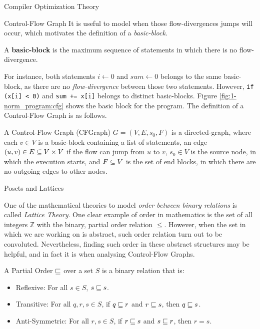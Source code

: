 \begin{section}{Compiler Optimization Theory}
\begin{subsection}{Control-Flow Graph}
It is useful to model when those flow-divergences jumps will occur, which
motivates the definition of a \textit{basic-block}.

\begin{definition}
A \textbf{basic-block} is the maximum sequence of statements in which there is
no flow-divergence.
\end{definition}

For instance, both statements $i \leftarrow 0$ and $\textit{sum} \leftarrow 0$ belongs
to the same basic-block, as there are no \textit{flow-divergence} between
those two statements. However, \texttt{if (x[i] < 0)} and \texttt{sum += x[i]}
belongs to distinct basic-blocks. Figure \ref{fig:1-norm_program:cfg} shows
the basic block for the program. The definition of a Control-Flow Graph is
as follows.

\begin{definition}
	A Control-Flow Graph (CFGraph) $G = (V, E, s_0, F)$ is a directed-graph,
	where each $v \in V$ is a basic-block containing a list of statements,
	an edge $(u, v) \in E \subseteq V \times V$ if the flow can jump from
	$u$ to $v$, $s_0 \in V$ is the source node, in which the execution
	starts, and $F \subseteq V$ is the set of end blocks, in which there
	are no outgoing edges to other nodes.
\end{definition}

\end{subsection}

\begin{subsection}{Posets and Lattices}

One of the mathematical theories to model \textit{order between binary relations} is
called \textit{Lattice Theory}. One clear example of order in mathematics
is the set of all integers $\mathbb{Z}$ with the binary, partial order relation $\leq$.
However,
when the set in which we are working on is abstract, such order relation turn out to be
convoluted. Nevertheless, finding such order in these abstract structures may be
helpful, and in fact it is when analysing Control-Flow Graphs.

\begin{definition}
A Partial Order $\sqsubseteq$ over a set $S$ is a binary relation that is:
\begin{itemize}
	\item Reflexive: For all $s \in S$, $s \sqsubseteq s$.
	\item Transitive: For all $q, r, s \in S$, if $q \sqsubseteq r$ and $r \sqsubseteq s$, then
	$q \sqsubseteq s$.
	\item Anti-Symmetric: For all $r, s \in S$, if $r \sqsubseteq s$ and $s \sqsubseteq r$,
	then $r = s$.


\end{itemize}
\end{definition}
\end{subsection}
\end{section}
